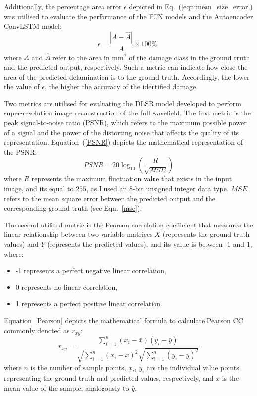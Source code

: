 Additionally, the percentage area error $\epsilon$ depicted in Eq.~(\ref{eqn:mean_size_error}) was utilised to evaluate the performance of the FCN models and the Autoencoder ConvLSTM model:
\begin{equation}
	\epsilon=\frac{|A-\hat{A}|}{A} \times 100\%,
	\label{eqn:mean_size_error}
\end{equation}
where \(A\) and \(\hat{A}\) refer to the area in mm\textsuperscript{2} of the damage class in the ground truth and the predicted output, respectively.
Such a metric can indicate how close the area of the predicted delamination is to the ground truth.
Accordingly, the lower the value of $\epsilon$, the higher the accuracy of the identified damage. 

Two metrics are utilised for evaluating the DLSR model developed to perform super-resolution image reconstruction of the full wavefield.
The first metric is the peak signal-to-noise ratio (PSNR), which refers to the maximum possible power of a signal and the power of the distorting noise that affects the quality of its representation.
Equation~(\ref{PSNR}) depicts the mathematical representation of the PSNR:
\begin{equation}
	PSNR=20\log_{10}\left(\frac{R}{\sqrt{MSE}}\right)
	\label{PSNR}
\end{equation}
where \(R\) represents the maximum fluctuation value that exists in the input image, and its equal to \(255\), as I used an 8-bit unsigned integer data type.
\(MSE\) refers to the mean square error between the predicted output and the corresponding ground truth (see Eqn.~\ref{mse}).

The second utilised metric is the Pearson correlation coefficient that measures the linear relationship between two variable matrices \textbf{\(X\)} (represents the ground truth values) and \textbf{\(Y\)} (represents the predicted values), and its value is between -1 and 1, where:
\begin{itemize}
	\item -1 represents a perfect negative linear correlation,
	\item 0 represents no linear correlation,
	\item 1 represents a perfect positive linear correlation.
\end{itemize}
Equation~\ref{Pearson} depicts the mathematical formula to calculate Pearson CC commonly denoted as \(r_{xy}\):
\begin{equation}
	r_{xy} = \frac{\sum_{i=1}^{n}(x_i - \bar{x})(y_i-\bar{y})}{\sqrt{\sum_{i=1}^{n}(x_i - \bar{x})^2}\sqrt{\sum_{i=1}^{n}(y_i - \bar{y})^2}}
	\label{Pearson}
\end{equation}
where \(n\) is the number of sample points, \(x_i\), \(y_i\) are the individual value points representing the ground truth and predicted values, respectively, and \(\bar{x}\) is the mean value of the sample, analogously to \(\bar{y}\).


